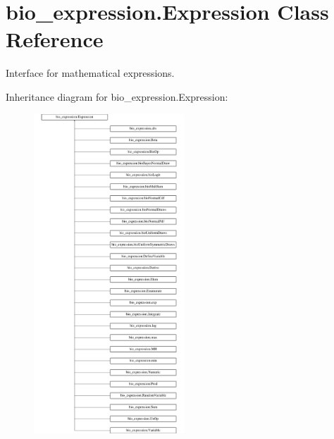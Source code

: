 \hypertarget{classbio__expression_1_1_expression}{\section{bio\+\_\+expression.\+Expression Class Reference}
\label{classbio__expression_1_1_expression}
}


Interface for mathematical expressions.  


Inheritance diagram for bio\+\_\+expression.\+Expression\+:\begin{figure}[H]
\begin{center}
\leavevmode
\includegraphics[height=12.000000cm]{d8/dd6/classbio__expression_1_1_expression}
\end{center}
\end{figure}
